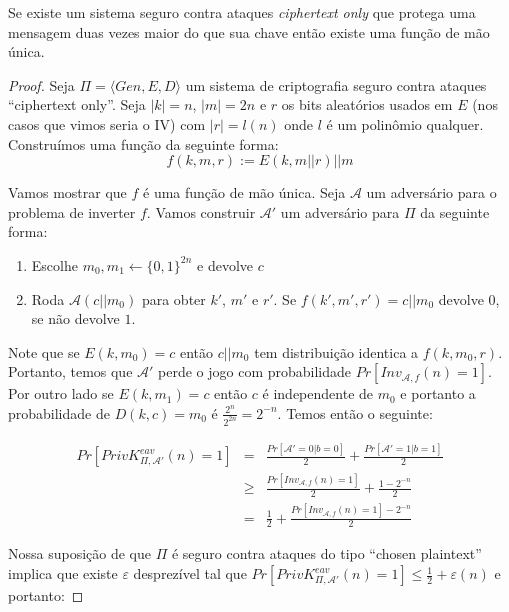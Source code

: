 \begin{theorem}
  Se existe um sistema seguro contra ataques {\em ciphertext only} que protega uma mensagem duas vezes maior do que sua chave então existe uma função de mão única.
\end{theorem}

\begin{proof}
Seja $\Pi = \langle Gen, E, D \rangle$ um sistema de criptografia seguro contra ataques ``ciphertext only''.
Seja $|k| = n$, $|m| = 2n$ e $r$ os bits aleatórios usados em $E$ (nos casos que vimos seria o IV) com $|r| = l(n)$ onde $l$ é um polinômio qualquer.
Construímos uma função da seguinte forma:
\begin{displaymath}
  f(k, m, r) := E(k, m||r)||m
\end{displaymath}

Vamos mostrar que $f$ é uma função de mão única.
Seja $\mathcal{A}$ um adversário para o problema de inverter $f$.
Vamos construir $\mathcal{A}'$ um adversário para $\Pi$ da seguinte forma:
\begin{enumerate}
\item Escolhe $m_0, m_1 \leftarrow \{0,1\}^{2n}$ e devolve $c$
\item Roda $\mathcal{A}(c||m_0)$ para obter $k'$, $m'$ e $r'$.
Se $f(k', m', r') = c ||m_0$ devolve $0$, se não devolve $1$.
\end{enumerate}

Note que se $E(k,m_0) = c$ então $c||m_0$ tem distribuição identica a $f(k, m_0, r)$.
Portanto, temos que $\mathcal{A}'$ perde o jogo com probabilidade $Pr[Inv_{\mathcal{A}, f}(n) = 1]$.
Por outro lado se $E(k, m_1) = c$ então $c$ é independente de $m_0$ e portanto a probabilidade de $D(k, c) = m_0 $ é $\frac{2^n}{2^{2n}} = 2^{-n}$.
Temos então o seguinte:


\begin{eqnarray*}
  Pr[PrivK_{\Pi, \mathcal{A}'}^{eav}(n) = 1] & = & \frac{Pr[\mathcal{A}' = 0 | b = 0]}{2} + \frac{Pr[\mathcal{A}' = 1 | b = 1]}{2}\\
  & \geq & \frac{Pr[Inv_{\mathcal{A},f}(n) = 1]}{2} + \frac{1 - 2^{-n}}{2}\\
  & = & \frac{1}{2} + \frac{Pr[Inv_{\mathcal{A},f}(n) = 1] - 2^{-n}}{2}
\end{eqnarray*}

Nossa suposição de que $\Pi$ é seguro contra ataques do tipo ``chosen plaintext'' implica que existe $\varepsilon$ desprezível tal que $Pr[PrivK_{\Pi, \mathcal{A}'}^{eav}(n) = 1] \leq \frac{1}{2} + \varepsilon(n)$ e portanto:


\end{proof}
